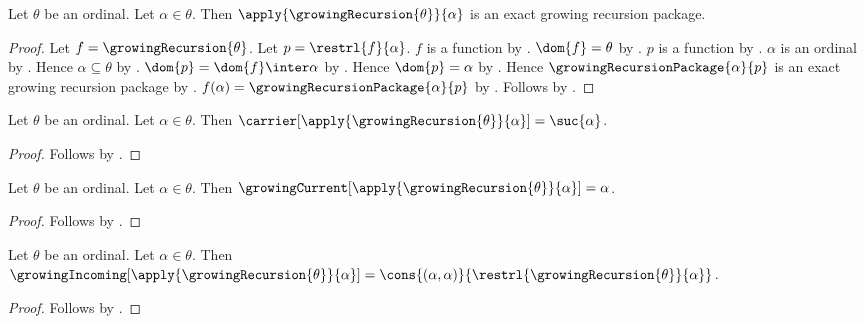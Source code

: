 \begin{theorem}\label{growing_recursion_value_is_exact_package}
    Let $\theta$ be an ordinal.
    Let $\alpha\in\theta$.
    Then $\apply{\growingRecursion{\theta}}{\alpha}$ is an exact
        growing recursion package.
\end{theorem}
\begin{proof}
    Let $f=\growingRecursion{\theta}$.
    Let $p=\restrl{f}{\alpha}$.
    $f$ is a function by .
    $\dom{f}=\theta$ by .
    $p$ is a function by .
    $\alpha$ is an ordinal by .
    Hence $\alpha\subseteq\theta$ by
        .
    $\dom{p}=\dom{f}\inter\alpha$ by
        .
    Hence $\dom{p}=\alpha$ by
        .
    Hence $\growingRecursionPackage{\alpha}{p}$ is an exact
        growing recursion package by
        .
    $f(\alpha)=\growingRecursionPackage{\alpha}{p}$ by
        .
    Follows by \auto.
\end{proof}

\begin{proposition}\label{growing_recursion_value_carrier}
    Let $\theta$ be an ordinal.
    Let $\alpha\in\theta$.
    Then $\carrier[\apply{\growingRecursion{\theta}}{\alpha}]=\suc{\alpha}$.
\end{proposition}
\begin{proof}
    Follows by
        .
\end{proof}

\begin{proposition}\label{growing_recursion_value_current}
    Let $\theta$ be an ordinal.
    Let $\alpha\in\theta$.
    Then $\growingCurrent[\apply{\growingRecursion{\theta}}{\alpha}]=\alpha$.
\end{proposition}
\begin{proof}
    Follows by
        .
\end{proof}

\begin{proposition}\label{growing_recursion_value_incoming}
    Let $\theta$ be an ordinal.
    Let $\alpha\in\theta$.
    Then $\growingIncoming[\apply{\growingRecursion{\theta}}{\alpha}]
        =\cons{(\alpha,\alpha)}{
            \restrl{\growingRecursion{\theta}}{\alpha}}$.
\end{proposition}
\begin{proof}
    Follows by
        .
\end{proof}

